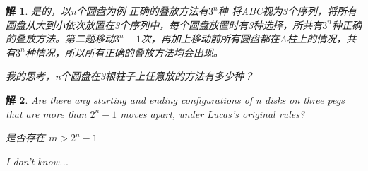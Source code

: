\documentclass[mode=geye]{elegantnote}
\newtheorem{answer}{解}
\begin{document}
	\begin{answer}
		是的，以n个圆盘为例
		正确的叠放方法有$ 3^n $种 将ABC视为3个序列，将所有圆盘从大到小依次放置在3个序列中，每个圆盘放置时有3种选择，所共有$ 3^n $种正确的叠放方法。第二题移动$ 3^n-1 $次，再加上移动前所有圆盘都在A柱上的情况，共有$ 3^n $种情况，所以所有正确的叠放方法均会出现。
		
		我的思考，n个圆盘在3根柱子上任意放的方法有多少种？
	\end{answer}

	\begin{answer}
		Are there any starting and ending configurations of n disks on three pegs
		that are more than $ 2^n − 1 $ moves apart, under Lucas's original rules?
		
		是否存在 $ m > 2^n-1 $
		
		I don't know...
	\end{answer}
	
	
\end{document}
